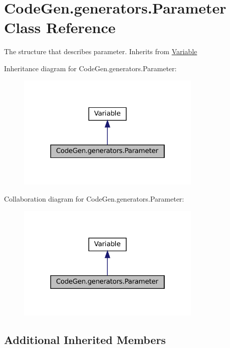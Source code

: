 \hypertarget{classCodeGen_1_1generators_1_1Parameter}{}\section{Code\+Gen.\+generators.\+Parameter Class Reference}
\label{classCodeGen_1_1generators_1_1Parameter}


The structure that describes parameter. Inherits from \mbox{\hyperlink{classCodeGen_1_1generators_1_1Variable}{Variable}}  




Inheritance diagram for Code\+Gen.\+generators.\+Parameter\+:
\nopagebreak
\begin{figure}[H]
\begin{center}
\leavevmode
\includegraphics[width=250pt]{classCodeGen_1_1generators_1_1Parameter__inherit__graph}
\end{center}
\end{figure}


Collaboration diagram for Code\+Gen.\+generators.\+Parameter\+:
\nopagebreak
\begin{figure}[H]
\begin{center}
\leavevmode
\includegraphics[width=250pt]{classCodeGen_1_1generators_1_1Parameter__coll__graph}
\end{center}
\end{figure}
\subsection*{Additional Inherited Members}


